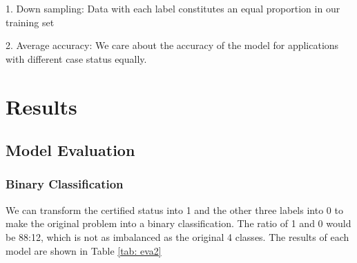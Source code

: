 \documentclass{article}
\begin{document}
1. Down sampling: Data with each label constitutes an equal proportion in our training set

2. Average accuracy: We care about the accuracy of the model for applications with different case status equally. 

\section{Results}
\subsection{Model Evaluation}
\subsubsection{Binary Classification}
We can transform the certified status into 1 and the other three labels into 0 to make the original problem into a binary classification. The ratio of 1 and 0 would be 88:12, which is not as imbalanced as the original 4 classes. The results of each model are shown in Table \ref{tab: eva2}
\end{document}
